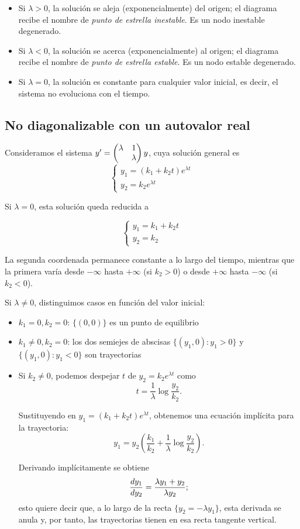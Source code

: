 \documentclass[../ecuaciones_diferenciales.tex]{subfiles}
\begin{document}
\begin{itemize}
	\item Si \(\lambda > 0\), la solución se aleja (exponencialmente) del origen; el
	      diagrama recibe el nombre de \emph{punto de estrella inestable}. Es un nodo
	      inestable degenerado.
	\item Si \(\lambda < 0\), la solución se acerca (exponencialmente) al origen; el
	      diagrama recibe el nombre de \emph{punto de estrella estable}. Es un nodo
	      estable degenerado.
	\item Si \(\lambda = 0\), la solución es constante para cualquier valor inicial,
	      es decir, el sistema no evoluciona con el tiempo.
\end{itemize}

\subsection{No diagonalizable con un autovalor real}

Consideramos el sistema \(y' = \begin{pmatrix}\lambda & 1 \\ & \lambda\end{pmatrix}y\), cuya solución
general es
\[
	\begin{cases}
		y_1 = (k_1+k_2t)e^{\lambda t} \\
		y_2 = k_2e^{\lambda t}
	\end{cases}
\]

Si \(\lambda = 0\), esta solución queda reducida a

\[
	\begin{cases}
		y_1 = k_1 + k_2 t \\
		y_2 = k_2
	\end{cases}
\]

La segunda coordenada permanece constante a lo largo del tiempo, mientras que la
primera varía desde \(-\infty\) hasta \(+\infty\) (si \(k_2 > 0\)) o desde
\(+\infty\) hasta \(-\infty\) (si \(k_2 < 0\)).

Si \(\lambda \neq 0\), distinguimos casos en función del valor inicial:

\begin{itemize}
	\item \(k_1 = 0, k_2 = 0\): \(\{(0,0)\}\) es un punto de equilibrio
	\item \(k_1 \neq 0, k_2 = 0\): los dos semiejes de abscisas
	      \(\{(y_1, 0) : y_1 > 0\}\) y \(\{(y_1,0) : y_1 < 0\}\) son trayectorias
	\item Si \(k_2 \neq 0\), podemos despejar \(t\) de \(y_2 = k_2e^{\lambda t}\) como
	      \[t = \frac{1}{\lambda} \log \frac{y_2}{k_2}.\]

	      Sustituyendo en \(y_1 = (k_1 + k_2t)e^{\lambda t}\), obtenemos una ecuación
	      implícita para la trayectoria:
	      \[y_1 = y_2 \left( \frac{k_1}{k_2} + \frac{1}{\lambda} \log \frac{y_2}{k_2}
		      \right).\]

	      Derivando implícitamente se obtiene
	      \[\frac{\mathop{d\!} y_1}{\mathop{d\!} y_2} = \frac{\lambda y_1 + y_2}{\lambda y_2};\]
		  esto quiere decir que, a lo largo de la recta 
		  \(\{y_2 = -\lambda y_1\}\), esta derivada se anula y, por tanto, las 
		  trayectorias tienen en esa recta tangente vertical.
\end{itemize}
\end{document}
